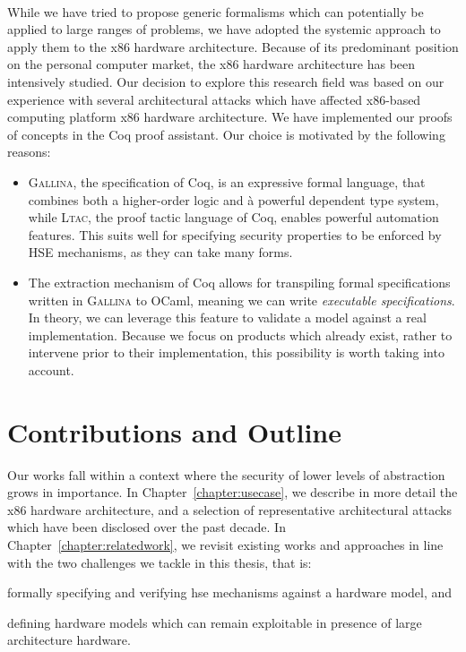 \paragraph{}
%
While we have tried to propose generic formalisms which can potentially be
applied to large ranges of problems, we have adopted the systemic approach to
apply them to the x86 hardware architecture.
%
Because of its predominant position on the personal computer market, the x86
hardware architecture has been intensively studied.
%
Our decision to explore this research field was based on our experience with
several architectural attacks which have affected x86-based computing platform
x86 hardware architecture.
%
We have implemented our proofs of concepts in the Coq proof assistant.
%
Our choice is motivated by the following reasons:
%
\begin{itemize}
\item {\scshape Gallina}, the specification of Coq, is an expressive formal
  language, that combines both a higher-order logic and à powerful dependent
  type system, while {\scshape Ltac}, the proof tactic language of Coq, enables
  powerful automation features.
  This suits well for specifying security properties to be enforced by HSE
  mechanisms, as they can take many forms.
\item The extraction mechanism of Coq allows for transpiling formal
  specifications written in {\scshape Gallina} to OCaml, meaning we can write
  \emph{executable specifications}.
  In theory, we can leverage this feature to validate a model against a real
  implementation.
  Because we focus on products which already exist, rather to intervene prior to
  their implementation, this possibility is worth taking into account.
\end{itemize}

\section{Contributions and Outline}

Our works fall within a context where the security of lower levels of
abstraction  grows in
importance.
%
In Chapter~\ref{chapter:usecase}, we describe in more detail the x86 hardware
architecture, and a selection of representative architectural attacks which have
been disclosed over the past decade.
%
In Chapter~\ref{chapter:relatedwork}, we revisit existing works and approaches
in line with the two challenges we tackle in this thesis, that is:
%
\begin{inparaenum}[(1)]
\item formally specifying and verifying \ac{hse} mechanisms against a hardware
  model, and
%
\item defining hardware models which can remain exploitable in presence of large
  architecture hardware. 
\end{inparaenum}

